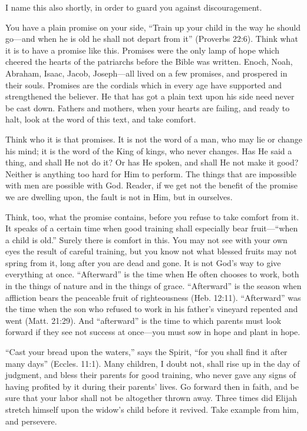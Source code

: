\documentclass[
]{book}
\begin{document}
I name this also shortly, in order to guard you against discouragement.

You have a plain promise on your side, ``Train up your child in the way he should go---and when he is old he shall not depart from it'' (Proverbs 22:6). Think what it is to have a promise like this. Promises were the only lamp of hope which cheered the hearts of the patriarchs before the Bible was written. Enoch, Noah, Abraham, Isaac, Jacob, Joseph---all lived on a few promises, and prospered in their souls. Promises are the cordials which in every age have supported and strengthened the believer. He that has got a plain text upon his side need never be cast down. Fathers and mothers, when your hearts are failing, and ready to halt, look at the word of this text, and take comfort.

Think who it is that promises. It is not the word of a man, who may lie or change his mind; it is the word of the King of kings, who never changes. Has He said a thing, and shall He not do it? Or has He spoken, and shall He not make it good? Neither is anything too hard for Him to perform. The things that are impossible with men are possible with God. Reader, if we get not the benefit of the promise we are dwelling upon, the fault is not in Him, but in ourselves.

Think, too, what the promise contains, before you refuse to take comfort from it. It speaks of a certain time when good training shall especially bear fruit---``when a child is old.'' Surely there is comfort in this. You may not see with your own eyes the result of careful training, but you know not what blessed fruits may not spring from it, long after you are dead and gone. It is not God's way to give everything at once. ``Afterward'' is the time when He often chooses to work, both in the things of nature and in the things of grace. ``Afterward'' is the season when affliction bears the peaceable fruit of righteousness (Heb. 12:11). ``Afterward'' was the time when the son who refused to work in his father's vineyard repented and went (Matt. 21:29). And ``afterward'' is the time to which parents must look forward if they see not success at once---you must sow in hope and plant in hope.

``Cast your bread upon the waters,'' says the Spirit, ``for you shall find it after many days'' (Eccles. 11:1). Many children, I doubt not, shall rise up in the day of judgment, and bless their parents for good training, who never gave any signs of having profited by it during their parents' lives. Go forward then in faith, and be sure that your labor shall not be altogether thrown away. Three times did Elijah stretch himself upon the widow's child before it revived. Take example from him, and persevere.
\end{document}
